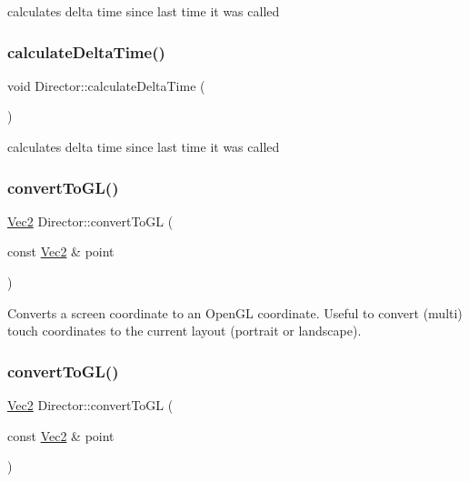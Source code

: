 calculates delta time since last time it was called \mbox{\label{classDirector_a74f5e65404e0ce2d6336d52ce68640ac}} 
\subsubsection{\texorpdfstring{calculate\+Delta\+Time()}{calculateDeltaTime()}\hspace{0.1cm}{\footnotesize\ttfamily [2/2]}}
{\footnotesize\ttfamily void Director\+::calculate\+Delta\+Time (\begin{DoxyParamCaption}{ }\end{DoxyParamCaption})\hspace{0.3cm}{\ttfamily [protected]}}

calculates delta time since last time it was called \mbox{\label{classDirector_a29371003ac8c3a6856eee412aa129d9c}} 
\subsubsection{\texorpdfstring{convert\+To\+G\+L()}{convertToGL()}\hspace{0.1cm}{\footnotesize\ttfamily [1/2]}}
{\footnotesize\ttfamily \hyperlink{classVec2}{Vec2} Director\+::convert\+To\+GL (\begin{DoxyParamCaption}\item[{const \hyperlink{classVec2}{Vec2} \&}]{point }\end{DoxyParamCaption})}

Converts a screen coordinate to an Open\+GL coordinate. Useful to convert (multi) touch coordinates to the current layout (portrait or landscape). \mbox{\label{classDirector_a29371003ac8c3a6856eee412aa129d9c}} 
\subsubsection{\texorpdfstring{convert\+To\+G\+L()}{convertToGL()}\hspace{0.1cm}{\footnotesize\ttfamily [2/2]}}
{\footnotesize\ttfamily \hyperlink{classVec2}{Vec2} Director\+::convert\+To\+GL (\begin{DoxyParamCaption}\item[{const \hyperlink{classVec2}{Vec2} \&}]{point }\end{DoxyParamCaption})}

